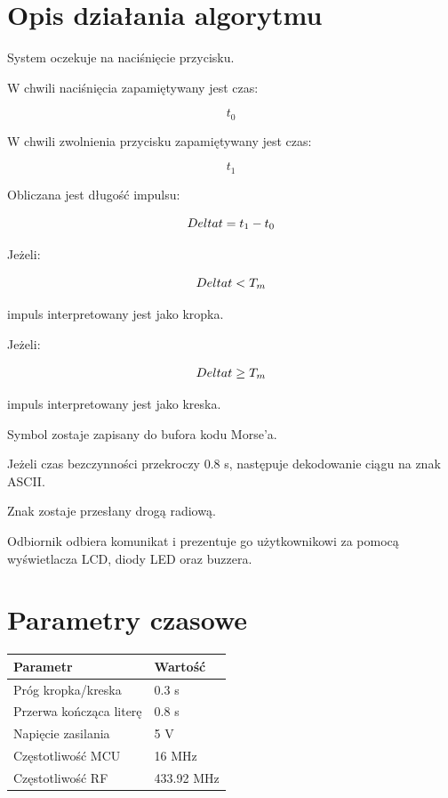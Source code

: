 \documentclass[a4paper,12pt]{article}
\begin{document}
\section{Opis działania algorytmu}

System oczekuje na naciśnięcie przycisku.

W chwili naciśnięcia zapamiętywany jest czas:

\[
t_0
\]

W chwili zwolnienia przycisku zapamiętywany jest czas:

\[
t_1
\]

Obliczana jest długość impulsu:

\[
\\Delta t = t_1 - t_0
\]

Jeżeli:

\[
\\Delta t < T_m
\]

impuls interpretowany jest jako kropka.

Jeżeli:

\[
\\Delta t \ge T_m
\]

impuls interpretowany jest jako kreska.

Symbol zostaje zapisany do bufora kodu Morse'a.

Jeżeli czas bezczynności przekroczy 0.8 s, następuje dekodowanie ciągu na znak ASCII.

Znak zostaje przesłany drogą radiową.

Odbiornik odbiera komunikat i prezentuje go użytkownikowi za pomocą wyświetlacza LCD, diody LED oraz buzzera.

\section{Parametry czasowe}

\begin{table}[h]
\centering
\begin{tabular}{|l|l|}
\hline
Parametr & Wartość \\
\hline
Próg kropka/kreska & 0.3 s \\
Przerwa kończąca literę & 0.8 s \\
Napięcie zasilania & 5 V \\
Częstotliwość MCU & 16 MHz \\
Częstotliwość RF & 433.92 MHz \\
\hline
\end{tabular}
\end{table}
\end{document}
